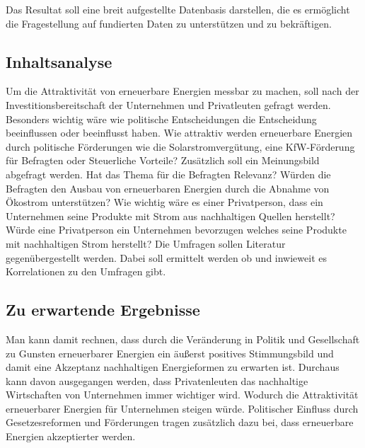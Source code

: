 \documentclass[12pt,a4paper]{article}
\begin{document}
Das Resultat soll eine breit aufgestellte Datenbasis darstellen, 
die es ermöglicht die Fragestellung auf fundierten Daten zu unterstützen und zu bekräftigen.  

\subsection*{Inhaltsanalyse}
Um die Attraktivität von erneuerbare Energien messbar zu machen, 
soll nach der Investitionsbereitschaft der Unternehmen und Privatleuten 
gefragt werden. Besonders wichtig wäre wie politische Entscheidungen die 
Entscheidung beeinflussen oder beeinflusst haben. Wie attraktiv werden erneuerbare 
Energien durch politische Förderungen wie die Solarstromvergütung, eine KfW-Förderung 
für Befragten oder Steuerliche Vorteile? 
 Zusätzlich soll ein Meinungsbild abgefragt werden. 
 Hat das Thema für die Befragten Relevanz? Würden die Befragten den 
 Ausbau von erneuerbaren Energien durch die Abnahme von Ökostrom unterstützen? 
 Wie wichtig wäre es einer Privatperson, dass ein Unternehmen seine Produkte mit Strom 
 aus nachhaltigen Quellen herstellt? Würde eine Privatperson ein Unternehmen bevorzugen 
 welches seine Produkte mit nachhaltigen Strom herstellt? Die Umfragen sollen Literatur 
 gegenübergestellt werden. Dabei soll ermittelt werden ob und inwieweit es Korrelationen 
 zu den Umfragen gibt. 

 \subsection*{Zu erwartende Ergebnisse}
 Man kann damit rechnen, dass durch die Veränderung in Politik und Gesellschaft 
 zu Gunsten erneuerbarer Energien ein äußerst positives Stimmungsbild und damit 
 eine Akzeptanz nachhaltigen Energieformen zu erwarten ist. Durchaus kann
 davon ausgegangen werden, dass Privatenleuten das nachhaltige Wirtschaften von Unternehmen
 immer wichtiger wird. Wodurch die Attraktivität erneuerbarer Energien für Unternehmen steigen 
 würde. Politischer Einfluss durch Gesetzesreformen und Förderungen tragen zusätzlich 
 dazu bei, dass erneuerbare Energien akzeptierter werden. 

 

\nocite{*}
\printbibliography
\end{document}
